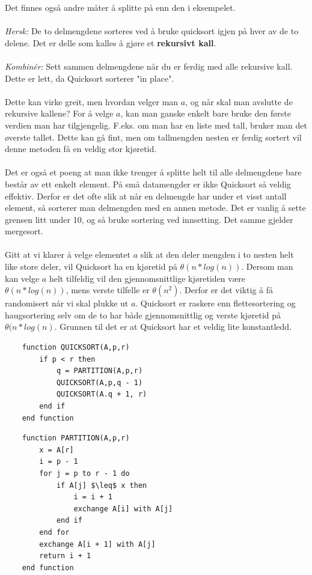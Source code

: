 \noindent Det finnes også andre måter å splitte på enn den i eksempelet.
\\\\
\textit{Hersk:} De to delmengdene sorteres ved å bruke quicksort igjen på hver av de to delene. Det er delle som kalles å gjøre et \textbf{rekursivt kall}.
\\\\
\textit{Kombinér:} Sett sammen delmengdene når du er ferdig med alle rekursive kall. Dette er lett, da Quicksort sorterer "in place".
\\\\
Dette kan virke greit, men hvordan velger man $a$, og når skal man avslutte de rekursive kallene? For å velge $a$, kan man ganske enkelt bare bruke den første verdien man har tilgjengelig. F.eks. om man har en liste med tall, bruker man det øverste tallet. Dette kan gå fint, men om tallmengden nesten er ferdig sortert vil denne metoden få en veldig stor kjøretid.
\\\\
Det er også et poeng at man ikke trenger å splitte helt til alle delmengdene bare består av ett enkelt element. På små datamengder er ikke Quicksort så veldig effektiv. Derfor er det ofte slik at når en delmengde har under et visst antall element, så sorterer man delmengden med en annen metode. Det er vanlig å sette grensen litt under 10, og så bruke sortering ved innsetting. Det samme gjelder mergesort.
\\\\
Gitt at vi klarer å velge elementet $a$ slik at den deler mengden i to nesten helt like store deler, vil Quicksort ha en kjøretid på \textbf{$\theta(n * log(n))$}. Dersom man kan velge $a$ helt tilfeldig vil den gjennomsnittlige kjøretiden være \textbf{$\theta(n * log(n))$}, mens verste tilfelle er $\theta(n^2)$. Derfor er det viktig å få randomisert når vi skal plukke ut $a$. Quicksort er raskere enn flettesortering og haugsortering selv om de to har både gjennomsnittlig og verste kjøretid på $\theta(n * log(n)$. Grunnen til det er at Quicksort har et veldig lite konstantledd.

\begin{lstlisting}
    function QUICKSORT(A,p,r)
    	if p < r then
    		q = PARTITION(A,p,r)
    		QUICKSORT(A,p,q - 1)
    		QUICKSORT(A.q + 1, r)
    	end if
    end function
\end{lstlisting}

\begin{lstlisting}
    function PARTITION(A,p,r)
	    x = A[r]
    	i = p - 1
    	for j = p to r - 1 do
    		if A[j] $\leq$ x then
    			i = i + 1
    			exchange A[i] with A[j]
    		end if
    	end for
    	exchange A[i + 1] with A[j]
    	return i + 1
    end function
\end{lstlisting}

